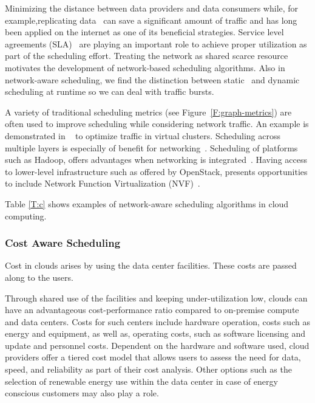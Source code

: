 \documentclass[final,5p,times,twocolumn]{elsarticle}
\begin{document}
Minimizing the distance between data providers and data consumers while, for example,replicating data~\cite{www-akamai} can save a significant amount of traffic and has long been applied on the internet as one of its beneficial strategies. Service level agreements (SLA)~\cite{breitgand2012improving} are playing an important role to achieve proper utilization as part of the scheduling effort. Treating the network as shared scarce resource~\cite{rampersaud2016sharing} motivates the development of network-based scheduling algorithms. Also in network-aware scheduling, we find the distinction between static~\cite{biran2012stable} and dynamic scheduling at runtime so we can deal with traffic bursts.

A variety of traditional scheduling metrics (see Figure~\ref{F:graph-metrics}) are often used to improve scheduling while considering network traffic. An example is demonstrated in ~\cite{yu2017survivable} to optimize traffic in virtual clusters. Scheduling across multiple layers is especially of benefit for networking~\cite{bi2015sla}. Scheduling of platforms such as Hadoop, offers advantages when networking is integrated~\cite{kondikoppa2012network}. Having access to lower-level infrastructure such as offered by OpenStack, presents opportunities to include Network Function Virtualization (NVF)~\cite{lucrezia2015introducing}.

Table \ref{T:c} shows examples of network-aware scheduling algorithms in cloud computing.



%


\subsubsection{Cost Aware Scheduling}\label{sec:cost}

Cost in clouds arises by using the data center facilities. These costs are passed along to the users.

Through shared use of the facilities and keeping under-utilization low, clouds can have an advantageous cost-performance ratio compared to on-premise compute and data centers. Costs for such centers include hardware operation, costs such as energy and equipment, as well as, operating costs, such as software licensing and update and personnel costs. Dependent on the hardware and software used, cloud providers offer a tiered cost model that allows users to assess the need for data, speed, and reliability as part of their cost analysis. Other options such as the selection of renewable energy use within the data center in case of energy conscious customers may also play a role.
\end{document}
